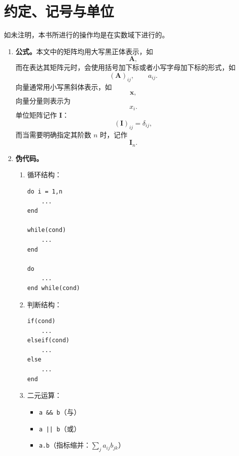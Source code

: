 \chapter*{约定、记号与单位}

如未注明，本书所进行的操作均是在实数域下进行的。

\begin{enumerate}[label=(\arabic*)]
\item \textbf{公式。}本文中的矩阵均用大写黑正体表示，如
\[
\mathbf A,
\]
而在表达其矩阵元时，会使用括号加下标或者小写字母加下标的形式，如
\[
(\mathbf A)_{ij},\qquad a_{ij}.
\]
向量通常用小写黑斜体表示，如
\[
\bm x,
\]
向量分量则表示为
\[
x_i.
\]
单位矩阵记作 $\mathbf I$：
\[
(\mathbf I)_{ij}=\delta_{ij},
\]
而当需要明确指定其阶数 $n$ 时，记作
\[
\mathbf I_n.
\]

\item \textbf{伪代码。}
\begin{enumerate}[label=(\roman*)]
\item 循环结构：
\begin{lstlisting}[style=bellacode,numbers=none]
do i = 1,n
    ...
end

while(cond)
    ...
end

do
    ...
end while(cond)
\end{lstlisting}
\item 判断结构：
\begin{lstlisting}[style=bellacode,numbers=none]
if(cond)
    ...
elseif(cond)
    ...
else
    ...
end
\end{lstlisting}
\item 二元运算：
\begin{itemize}
\item \texttt{a \&\& b}（与）
\item \texttt{a || b}（或）
\item \texttt{a.b}（指标缩并：$\sum_j a_{ij}b_{jk}$）
\end{itemize}
\end{enumerate}
\end{enumerate}
\clearpage
